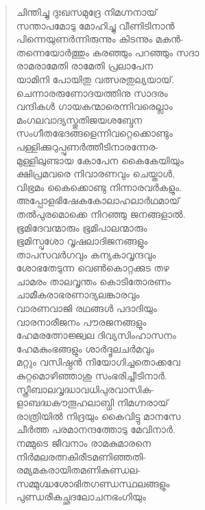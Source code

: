 \begin{verse}
ചിന്തിച്ചു ദുഃഖസമുദ്രേ നിമഗ്നനായ്\\
സന്താപമോടു മോഹിച്ചു വീണിടിനാന്‍\\
പിന്നെയുണര്‍ന്നിരുന്നും കിടന്നും മകന്‍-\\
തന്നെയോര്‍ത്തും കരഞ്ഞും പറഞ്ഞും സദാ\\
രാമരാമേതി രാമേതി പ്രലാപേന\\
യാമിനി പോയിതു വത്സരതുല്യയായ്.\\
ചെന്നാരരുണോദയത്തിനു സാദരം\\
വന്ദികള്‍ ഗായകന്മാരെന്നിവരെല്ലാം\\
മംഗലവാദ്യസ്തുതിജയശബ്ദേന\\
സംഗീതഭേദങ്ങളെന്നിവറ്റെക്കൊണ്ടും\\
പള്ളിക്കുറുപ്പുണര്‍ത്തീടിനാരന്നേര-\\
മുള്ളിലുണ്ടായ കോപേന കൈകേയിയും\\
ക്ഷിപ്രമവരെ നിവാരണവും ചെയ്താള്‍,\\
വിഭ്രമം കൈക്കൊണ്ടു നിന്നാരവര്‍കളും.\\
അപ്പോളഭിഷേകകോലാഹലാര്‍ഥമായ്\\
തല്‍പുരമൊക്കെ നിറഞ്ഞു ജനങ്ങളാല്‍.\\
ഭൂമിദേവന്മാരും ഭൂമിപാലന്മാരും\\
ഭൂമിസ്പൃശോ വൃഷലാദിജനങ്ങളും\\
താപസവര്‍ഗവും കന്യകാവൃന്ദവും\\
ശോഭതേടുന്ന വെണ്‍കൊറ്റക്കുട തഴ\\
ചാമരം താലവൃന്തം കൊടിതോരണം\\
ചാമീകരാഭരണാദ്യലങ്കാരവും\\
വാരണവാജി രഥങ്ങള്‍ പദാദിയും\\
വാരനാരീജനം പൗരജനങ്ങളും\\
ഹേമരത്നോജ്ജ്വല ദിവ്യസിംഹാസനം\\
ഹേമകുംഭങ്ങളും ശാര്‍ദ്ദൂലചര്‍മവും\\
മറ്റും വസിഷ്ഠന്‍ നിയോഗിച്ചതൊക്കവേ\\
കുറ്റമൊഴിഞ്ഞാശു സംഭരിച്ചീടിനാര്‍.\\
സ്ത്രീബാലവൃദ്ധാവധിപുരവാസിക-\\
ളാബദ്ധകൗതൂഹലാബ്ധി നിമഗ്നരായ്\\
രാത്രിയില്‍ നിദ്രയും കൈവിട്ടു മാനസേ\\
ചീര്‍ത്ത പരമാനന്ദത്തോടു മേവിനാര്‍.\\
നമ്മുടെ ജീവനാം രാമകുമാരനെ\\
നിര്‍മലരത്നകിരീടമണിഞ്ഞതി-\\
രമ്യമകരായിതമണികുണ്ഡല-\\
സമ്മുഗ്ദ്ധശോഭിതഗണ്ഡസ്ഥലങ്ങളും\\
പുണ്ഡരീകച്ഛദലോചനഭംഗിയും\\

\end{verse}
